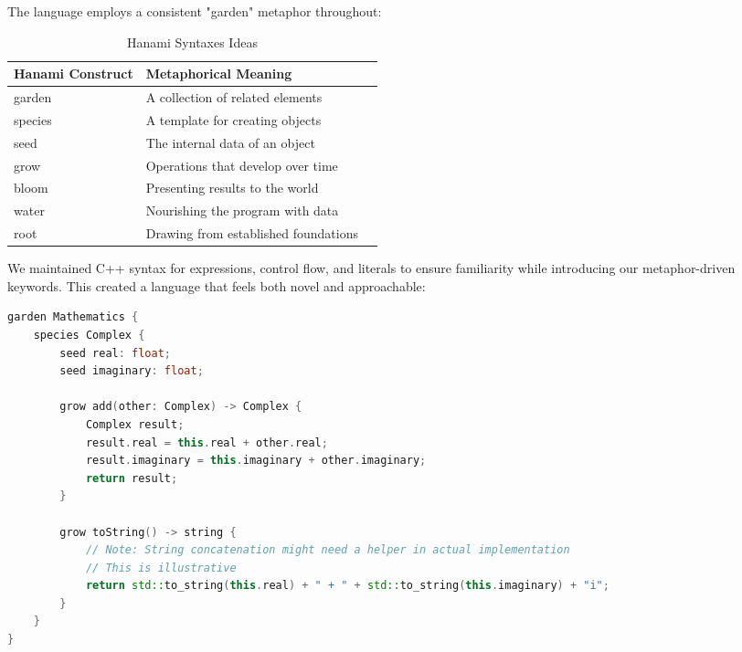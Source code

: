 \documentclass[conference]{IEEEtran}
\begin{document}
The language employs a consistent "garden" metaphor throughout:

\begin{table}[htbp] %
    \caption{Hanami Syntaxes Ideas}
    \label{table:syntaxes_ideas}
    \centering
    \begin{tabular}{@{}lll@{}} %
        \toprule
        \textbf{Hanami Construct} & \textbf{Metaphorical Meaning} \\
        \midrule
        garden & A collection of related elements \\
        species & A template for creating objects \\
        seed & The internal data of an object \\
        grow & Operations that develop over time \\
        bloom & Presenting results to the world \\
        water & Nourishing the program with data \\
        root & Drawing from established foundations \\
        \bottomrule
    \end{tabular}
\end{table}

We maintained C++ syntax for expressions, control flow, and literals to ensure familiarity while introducing our metaphor-driven keywords. This created a language that feels both novel and approachable:

\begin{lstlisting}[language=C++, caption={Hanami example with Complex numbers}, label={lst:complex_example}]
garden Mathematics {
    species Complex {
        seed real: float;
        seed imaginary: float;

        grow add(other: Complex) -> Complex {
            Complex result;
            result.real = this.real + other.real;
            result.imaginary = this.imaginary + other.imaginary;
            return result;
        }

        grow toString() -> string {
            // Note: String concatenation might need a helper in actual implementation
            // This is illustrative
            return std::to_string(this.real) + " + " + std::to_string(this.imaginary) + "i";
        }
    }
}
\end{lstlisting}
\end{document}
